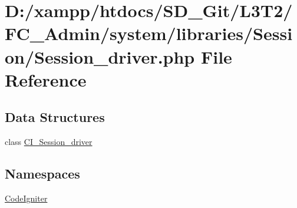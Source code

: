 \hypertarget{_session__driver_8php}{}\section{D\+:/xampp/htdocs/\+S\+D\+\_\+\+Git/\+L3\+T2/\+F\+C\+\_\+\+Admin/system/libraries/\+Session/\+Session\+\_\+driver.php File Reference}
\label{_session__driver_8php}
\subsection*{Data Structures}
\begin{DoxyCompactItemize}
\item 
class \hyperlink{class_c_i___session__driver}{C\+I\+\_\+\+Session\+\_\+driver}
\end{DoxyCompactItemize}
\subsection*{Namespaces}
\begin{DoxyCompactItemize}
\item 
 \hyperlink{namespace_code_igniter}{Code\+Igniter}
\end{DoxyCompactItemize}
